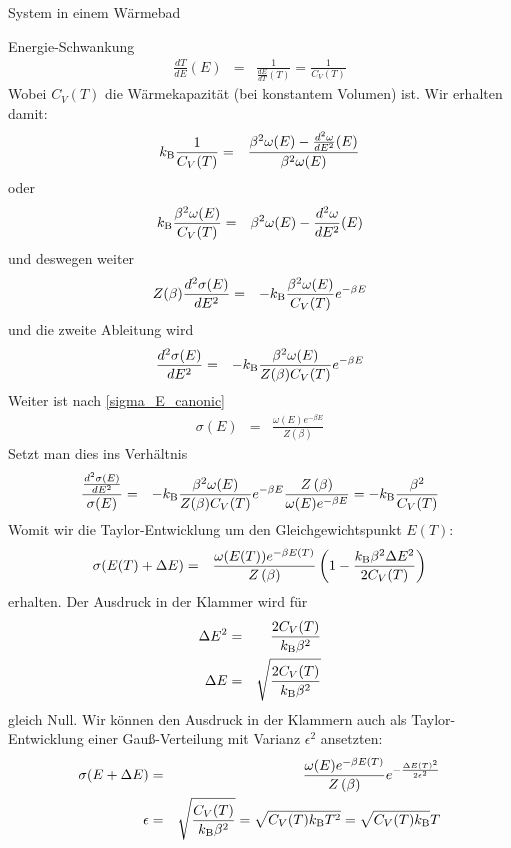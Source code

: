 \begin{chapter}{\titlestr}
\begin{section}{System in einem Wärmebad}
\begin{subsection}{Energie-Schwankung}
\begin{eqnarray*}
\frac{dT}{dE}(E) &=& \frac{1}{\frac{dE}{dT}(T)}=\frac{1}{C_V(T)}
\end{eqnarray*}
Wobei $C_V(T)$ die Wärmekapazität (bei konstantem Volumen) ist. Wir erhalten damit:
\begin{eqnarray*}
k_{\mathrm{B}} \frac{1}{C_V(T)} &=& \frac{\beta^2\omega(E)-\frac{d^2\omega}{dE^2}(E)}{\beta^2\omega(E)}
\end{eqnarray*}
oder
\begin{eqnarray*}
k_{\mathrm{B}} \frac{\beta^2\omega(E)}{C_V(T)} &=& \beta^2\omega(E)-\frac{d^2\omega}{dE^2}(E)
\end{eqnarray*}
und deswegen weiter
\begin{eqnarray*}
Z(\beta)\frac{d^2\sigma(E)}{dE^2} &=&-k_{\mathrm{B}} \frac{\beta^2\omega(E)}{C_V(T)}e^{-\beta E}
\end{eqnarray*}
und die zweite Ableitung wird
\begin{eqnarray*}
\frac{d^2\sigma(E)}{dE^2} &=&-k_{\mathrm{B}} \frac{\beta^2\omega(E)}{Z(\beta)C_V(T)}e^{-\beta E}
\end{eqnarray*}
Weiter ist nach \ref{sigma_E_canonic}
\begin{eqnarray*}
\sigma(E)&=& \frac{\omega(E)e^{-\beta E}}{Z\left(\beta\right)}
\end{eqnarray*}
Setzt man dies ins Verhältnis
\begin{eqnarray*}
\frac{\frac{d^2\sigma(E)}{dE^2}}{\sigma(E)} &=&-k_{\mathrm{B}} \frac{\beta^2\omega(E)}{Z(\beta)C_V(T)}e^{-\beta E}\frac{Z\left(\beta\right)}{\omega(E)e^{-\beta E}}
=-k_{\mathrm{B}} \frac{\beta^2}{C_V(T)}
\end{eqnarray*}
Womit wir die Taylor-Entwicklung um den Gleichgewichtspunkt $E(T)$:
\begin{eqnarray*}
\sigma(E(T)+\Delta E)&=& \frac{\omega(E(T))e^{-\beta E(T)}}{Z\left(\beta\right)}\left(1-\frac{k_{\mathrm{B}} \beta^2\Delta E^2}{2C_V(T)}\right)
\end{eqnarray*}
erhalten. Der Ausdruck in der Klammer wird für
\begin{eqnarray*}
\Delta E^2&=& \frac{2C_V(T)}{k_{\mathrm{B}} \beta^2}\\
\Delta E&=& \sqrt{\frac{2C_V(T)}{k_{\mathrm{B}} \beta^2}}
\end{eqnarray*}
gleich Null. Wir können den Ausdruck in der Klammern auch als Taylor-Entwicklung einer Gauß-Verteilung mit Varianz $\epsilon^2$ ansetzten:
\begin{eqnarray*}
\sigma(E+\Delta E)&=& \frac{\omega(E)e^{-\beta E(T)}}{Z\left(\beta\right)}e^{-\frac{\Delta E(T)^2}{2\epsilon^2}}\\
\epsilon &=& \sqrt{\frac{C_V(T)}{\kb \beta^2}}=\sqrt{C_V(T)\kb T^2}=\sqrt{C_V(T)\kb }T

\end{eqnarray*}
\end{subsection}
\end{section}
\end{chapter}
